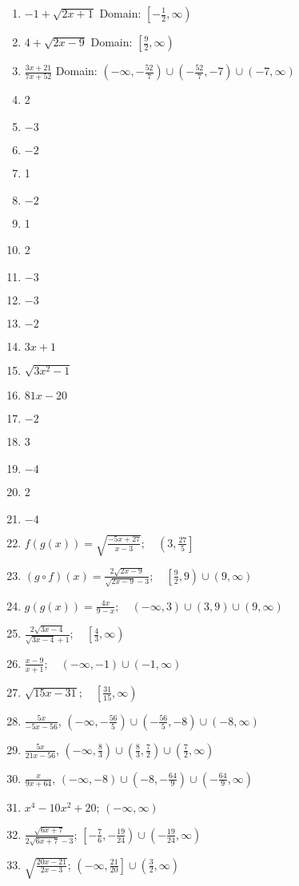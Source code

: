 \begin{enumerate}
	\item $-1 + \sqrt{2x+1}$ Domain: $\left[-\frac{1}{2}, \infty\right)$
	\item $4 + \sqrt{2x-9}$ Domain: $\left[\frac{9}{2}, \infty\right)$
	\item $\frac{3x+21}{7x+52}$ Domain: $\left(-\infty, -\frac{52}{7}\right) \cup \left(-\frac{52}{7}, -7\right) \cup (-7, \infty)$
	\item 2
     \item $-3$
     \item $-2$
     \item 1
     \item $-2$
     \item 1
     \item 2
     \item $-3$
     \item $-3$
     \item $-2$
     \item $3x + 1$
    \item $\sqrt{3x^2-1}$
    \item $81x-20$
    \item $-2$
    \item 3
    \item $-4$
    \item 2
    \item $-4$
    \item $f(g(x)) = \sqrt{\frac{-5x+27}{x-3}}; \quad \left(3, \frac{27}{5}\right]$
    \item $(g \circ f)(x) = \frac{2\sqrt{2x-9}}{\sqrt{2x-9}-3}; \quad \left[\frac{9}{2},9\right) \cup (9, \infty)$
    \item $g(g(x)) = \frac{4x}{9-x}; \quad (-\infty, 3) \cup (3, 9) \cup (9, \infty)$
    \item $\frac{2\sqrt{3x-4}}{\sqrt{3x-4}+1}; \quad  \left[\frac{4}{3}, \infty\right)$
    \item $\frac{x-9}{x+1}; \quad (-\infty, -1) \cup (-1, \infty)$
    \item $\sqrt{15x-31}; \quad \left[\frac{31}{15}, \infty\right)$
    \item $\frac{5x}{-5x-56}$, $\left(-\infty, -\frac{56}{5}\right) \cup \left(-\frac{56}{5}, -8\right) \cup (-8, \infty)$   \newline\\
	\item $\frac{5x}{21x-56}$, $\left(-\infty, \frac{8}{3}\right) \cup \left(\frac{8}{3}, \frac{7}{2}\right) \cup \left(\frac{7}{2}, \infty\right)$  \newline\\
	\item $\frac{x}{9x+64}$, $(-\infty, -8) \cup \left(-8, -\frac{64}{9}\right) \cup \left(-\frac{64}{9}, \infty\right)$
	\item $x^4-10x^2+20$; $(-\infty, \infty)$
    \item $\frac{\sqrt{6x+7}}{2\sqrt{6x+7}-3}$; $\left[-\frac{7}{6}, -\frac{19}{24}\right) \cup \left(-\frac{19}{24}, \infty\right)$
    \item $\sqrt{\frac{20x-21}{2x-3}}$; $\left(-\infty, \frac{21}{20}\right] \cup \left(\frac{3}{2}, \infty\right)$
    

\end{enumerate}

